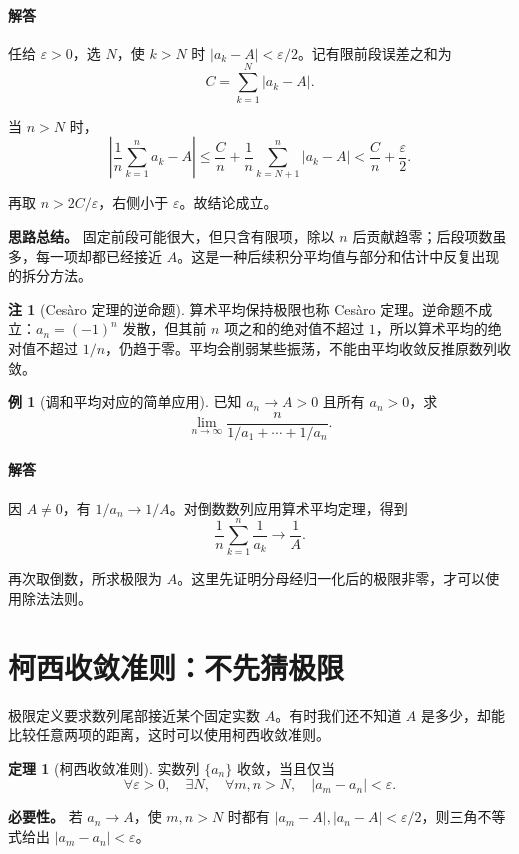 \documentclass[UTF8,fontset=fandol,12pt,oneside,openany]{ctexrep}
\theoremstyle{definition}
\newtheorem{theorem}{定理}[chapter]
\newtheorem{example}{例}[chapter]
\newtheorem*{remark}{注}
\begin{document}
\paragraph{解答} 任给 $\varepsilon>0$，选 $N$，使 $k>N$ 时 $|a_k-A|<\varepsilon/2$。记有限前段误差之和为
\[
C=\sum_{k=1}^N|a_k-A|.
\]

当 $n>N$ 时，
\[
\left|\frac1n\sum_{k=1}^na_k-A\right|
\le\frac Cn+\frac1n\sum_{k=N+1}^n|a_k-A|
<\frac Cn+\frac\varepsilon2.
\]

再取 $n>2C/\varepsilon$，右侧小于 $\varepsilon$。故结论成立。

\textbf{思路总结。} 固定前段可能很大，但只含有限项，除以 $n$ 后贡献趋零；后段项数虽多，每一项却都已经接近 $A$。这是一种后续积分平均值与部分和估计中反复出现的拆分方法。

\begin{remark}[Cesàro 定理的逆命题]
算术平均保持极限也称 Cesàro 定理。逆命题不成立：$a_n=(-1)^n$ 发散，但其前 $n$ 项之和的绝对值不超过 $1$，所以算术平均的绝对值不超过 $1/n$，仍趋于零。平均会削弱某些振荡，不能由平均收敛反推原数列收敛。
\end{remark}

\begin{example}[调和平均对应的简单应用]
已知 $a_n\to A>0$ 且所有 $a_n>0$，求
\[
\lim_{n\to\infty}\frac n{1/a_1+\cdots+1/a_n}.
\]
\end{example}

\paragraph{解答} 因 $A\ne0$，有 $1/a_n\to1/A$。对倒数数列应用算术平均定理，得到
\[
\frac1n\sum_{k=1}^n\frac1{a_k}\to\frac1A.
\]

再次取倒数，所求极限为 $A$。这里先证明分母经归一化后的极限非零，才可以使用除法法则。

\section{柯西收敛准则：不先猜极限}

极限定义要求数列尾部接近某个固定实数 $A$。有时我们还不知道 $A$ 是多少，却能比较任意两项的距离，这时可以使用柯西收敛准则。

\begin{theorem}[柯西收敛准则]
实数列 $\{a_n\}$ 收敛，当且仅当
\[
\forall\varepsilon>0,\quad\exists N,\quad\forall m,n>N,\quad |a_m-a_n|<\varepsilon.
\]
\end{theorem}

\textbf{必要性。} 若 $a_n\to A$，使 $m,n>N$ 时都有 $|a_m-A|,|a_n-A|<\varepsilon/2$，则三角不等式给出 $|a_m-a_n|<\varepsilon$。
\end{document}
